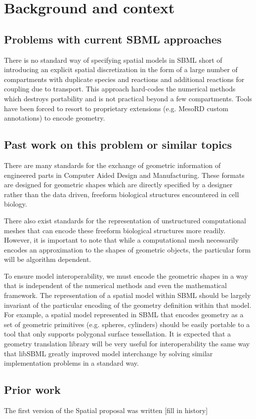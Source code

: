 
\section{Background and context}
\label{background}

\subsection{Problems with current SBML approaches}
There is no standard way of specifying spatial models in SBML short of introducing an explicit spatial discretization in the form of a large number of compartments with duplicate species and reactions and additional reactions for coupling due to transport.  This approach hard-codes the numerical methods which destroys portability and is not practical beyond a few compartments.  Tools have been forced to resort to proprietary extensions (e.g. MesoRD custom annotations) to encode geometry. 

\subsection{Past work on this problem or similar topics}
There are many standards for the exchange of geometric information of engineered parts in Computer Aided Design and Manufacturing.  These formats are designed for geometric shapes which are directly specified by a designer rather than the data driven, freeform biological structures encountered in cell biology.  

There also exist standards for the representation of unstructured computational meshes that can encode these freeform biological structures more readily.  However, it is important to note that while a computational mesh necessarily encodes an approximation to the shapes of geometric objects, the particular form will be algorithm dependent.  

To ensure model interoperability, we must encode the geometric shapes in a way that is independent of the numerical methods and even the mathematical framework.  The representation of a spatial model within SBML should be largely invariant of the particular encoding of the geometry definition within that model.  For example, a spatial model represented in SBML that encodes geometry as a set of geometric primitives (e.g. spheres, cylinders) should be easily portable to a tool that only supports polygonal surface tessellation.  It is expected that a geometry translation library will be very useful for interoperability the same way that libSBML greatly improved model interchange by solving similar implementation problems in a standard way.

\subsection{Prior work}

The first version of the Spatial proposal was written [fill in history]

